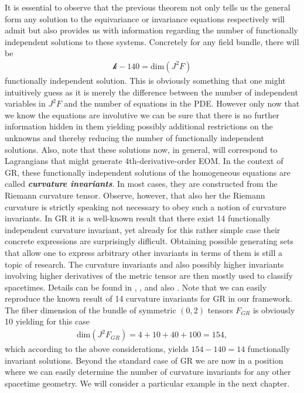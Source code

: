 It is essential to observe that the previous theorem not only tells us the general form any solution to the equivariance or invariance equations respectively will admit but also provides us with information regarding the number of functionally independent solutions to these systems. Concretely for any field bundle, there will be 
\begin{align}
    \mathcal{k} - 140 = \mathrm{dim}(J^2F)
\end{align}
functionally independent solution. This is obviously something that one might intuitively guess as it is merely the difference between the number of independent variables in $J^2F$ and the number of equations in the PDE. However only now that we know the equations are involutive we can be sure that there is no further information hidden in them yielding possibly additional restrictions on the unknowns and thereby reducing the number of functionally independent solutions. 
Also, note that these solutions now, in general, will correspond to Lagrangians that might generate $4$th-derivative-order EOM. 
In the context of GR, these functionally independent solutions of the homogeneous equations are called \textit{\textbf{curvature invariants}}. In most cases, they are constructed from the Riemann curvature tensor. Observe, however, that also her the Riemann curvature is strictly speaking not necessary to obey such a notion of curvature invariants. 
In GR it is a well-known result that there exist 14 functionally independent curvature invariant, yet already for this rather simple case their concrete expressions are surprisingly difficult. Obtaining possible generating sets that allow one to express arbitrary other invariants in terms of them is still a topic of research. The curvature invariants and also possibly higher invariants involving higher derivatives of the metric tensor are then mostly used to classify spacetimes. Details can be found in
\cite{2009CQGra..26b5013C}, \cite{Zakhary1997}, \cite{2002IJMPD..11..827C} and also \cite{doi:10.1063/1.531425}.
Note that we can easily reproduce the known result of 14 curvature invariants for GR in our framework. The fiber dimension of the bundle of symmetric $(0,2)$ tensors $F_{GR}$ is obviously 10 yielding for this case 
\begin{align}
    \mathrm{dim}(J^2F_{GR}) = 4 + 10 + 40 + 100 = 154,
\end{align}
which according to the above considerations, yields $154-140=14$ functionally invariant solutions. Beyond the standard case of GR we are now in a position where we can easily determine the number of curvature invariants for any other spacetime geometry. We will consider a particular example in the next chapter.

